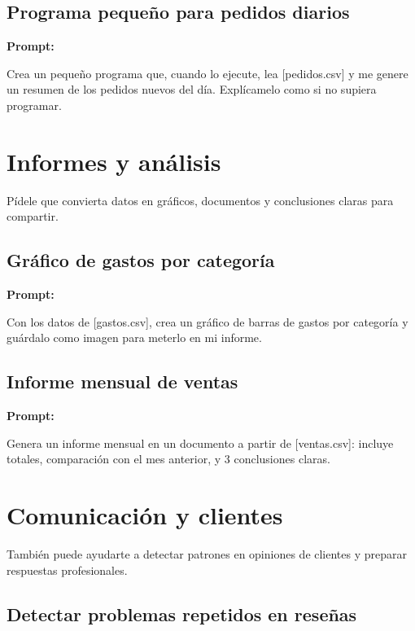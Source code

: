 \documentclass[11pt,a4paper]{report}
\begin{document}
\subsection{Programa pequeño para pedidos diarios}

\noindent\textbf{Prompt: }
\begin{codebox}
Crea un pequeño programa que, cuando lo ejecute, lea [pedidos.csv] y me genere un resumen de los pedidos nuevos del día. Explícamelo como si no supiera programar.
\end{codebox}

\section{ Informes y análisis}

Pídele que convierta datos en gráficos, documentos y conclusiones claras para compartir.

\subsection{Gráfico de gastos por categoría}

\noindent\textbf{Prompt: }
\begin{codebox}
Con los datos de [gastos.csv], crea un gráfico de barras de gastos por categoría y guárdalo como imagen para meterlo en mi informe.
\end{codebox}

\subsection{Informe mensual de ventas}

\noindent\textbf{Prompt: }
\begin{codebox}
Genera un informe mensual en un documento a partir de [ventas.csv]: incluye totales, comparación con el mes anterior, y 3 conclusiones claras.
\end{codebox}

\section{ Comunicación y clientes}

También puede ayudarte a detectar patrones en opiniones de clientes y preparar respuestas profesionales.

\subsection{Detectar problemas repetidos en reseñas}
\end{document}
